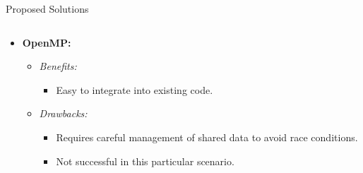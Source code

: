 \documentclass[aspectratio=169]{beamer} %
\begin{document}
    \begin{frame}{Proposed Solutions}
        \begin{columns}[T]
            \begin{column}{.6\textwidth}
            \begin{itemize}
                \item \textbf{OpenMP:} 
                \begin{itemize}
                    \item \textit{Benefits:} 
                        \begin{itemize}
                            \item Easy to integrate into existing code.
                        \end{itemize}
                    \item \textit{Drawbacks:}
                        \begin{itemize}
                            \item Requires careful management of shared data to avoid race conditions.
                            \item Not successful in this particular scenario.
                        \end{itemize}
                \end{itemize}
                

\end{itemize}
\end{column}
\end{columns}
\end{frame}
\end{document}
